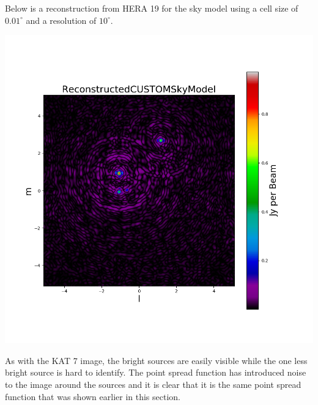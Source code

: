 Below is a reconstruction from HERA 19 for the sky model using a cell size of $0.01^\circ$ and a resolution of $10^\circ$. 
\begin{center}
    \includegraphics[scale=0.4]{images/RECON_HERA_19_4_POINT.png}
\end{center}
As with the KAT 7 image, the bright sources are easily visible while the one less bright source is hard to identify. The point spread function has introduced noise to the image around the sources and it is clear that it is the same point spread function that was shown earlier in this section.

